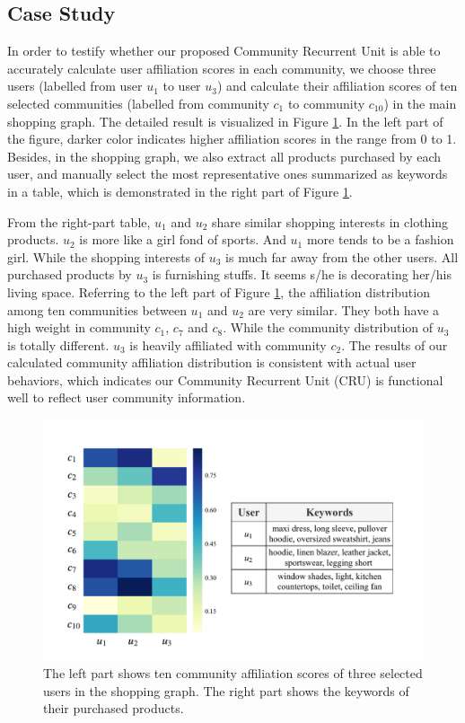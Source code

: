 \subsection{Case Study}
In order to testify whether our proposed Community Recurrent Unit is able to accurately calculate user affiliation scores in each community, we choose three users (labelled from user $u_1$ to user $u_3$) and calculate their affiliation scores of ten selected communities (labelled from community $c_1$ to community $c_{10}$) in the main shopping graph. The detailed result is visualized in Figure \ref{fig:case}. In the left part of the figure, darker color indicates higher affiliation scores in the range from 0 to 1. Besides, in the shopping graph, we also extract all products purchased by each user, and manually select the most representative ones summarized as keywords in a table, which is demonstrated in the right part of Figure \ref{fig:case}.

From the right-part table, $u_1$ and $u_2$ share similar shopping interests in clothing products. $u_2$ is more like a girl fond of sports. And $u_1$ more tends to be a fashion girl. While the shopping interests of $u_3$ is much far away from the other users. All purchased products by $u_3$ is furnishing stuffs. It seems s/he is decorating her/his living space. Referring to the left part of Figure \ref{fig:case}, the affiliation distribution among ten communities between $u_1$ and $u_2$ are very similar. They both have a high weight in community $c_1$, $c_7$ and $c_8$. While the community distribution of $u_3$ is totally different. $u_3$ is heavily affiliated with community $c_2$. The results of our calculated community affiliation distribution is consistent with actual user behaviors, which indicates our Community Recurrent Unit (CRU) is  functional well to reflect user community information.
\begin{figure}  
	\centering
	\includegraphics[width=1\columnwidth]{img/chapter4/case.pdf}
	\caption{The left part shows ten community affiliation scores of three selected users in the shopping graph. The right part shows the keywords of their purchased products.}
	
	\label{fig:case}
\end{figure}